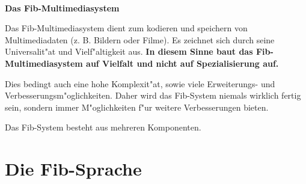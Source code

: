 \documentclass[12pt,a4paper]{article}
\begin{document}





\ \vspace{-2.5cm}
\begin{center}
	\LARGE\bf Das Fib-Multimediasystem\\
\end{center}

\bigskip\noindent
Das Fib-Multimediasystem dient zum kodieren und speichern von Multimediadaten (z. B. Bildern oder Filme). Es zeichnet sich durch seine Universalit"at und Vielf"altigkeit aus.
\textbf{In diesem Sinne baut das Fib-Multimediasystem auf Vielfalt und nicht auf Spezialisierung auf.}

Dies bedingt auch eine hohe Komplexit"at, sowie viele Erweiterungs- und Verbesserungsm"oglichkeiten. Daher wird das Fib-System niemals wirklich fertig sein, sondern immer M"oglichkeiten f"ur weitere Verbesserungen bieten.



Das Fib-System besteht aus mehreren Komponenten. %

\section{Die Fib-Sprache}
\end{document}
